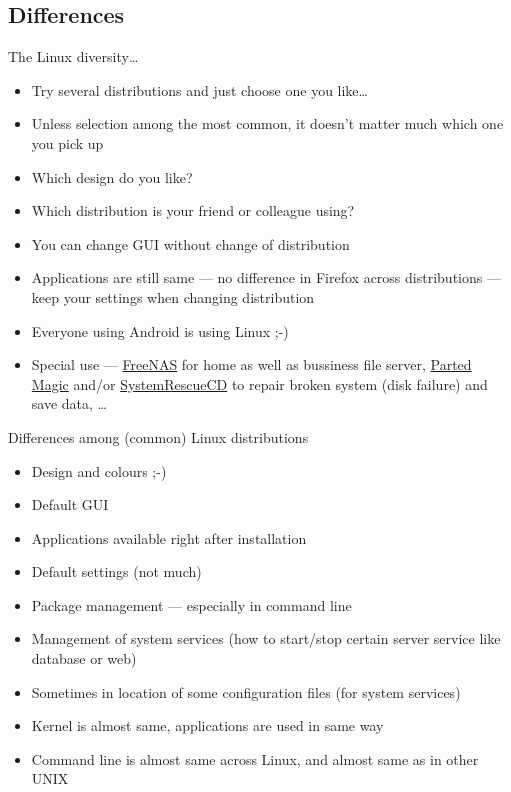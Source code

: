 \documentclass[compress, ucs, xelatex, 11pt, xcolor=svgnames,
  hyperref={
    bookmarks=true,
    unicode=true,
    colorlinks=true,
    pdftitle={Linux, command line and MetaCentrum},
    plainpages=false,
    pdfauthor={Vojtech Zeisek},
    pdfsubject={Course about use of Linux command line, writing shell scripts and using MetaCentrum of CESNET},
    pdfcreator={XeLaTeX, http://www.xelatex.org/},
    pdfkeywords={Linux, GNU, BASH, shell, command line, MetaCentrum},
    linkcolor=Sienna,
    anchorcolor=black,
    citecolor=green,
    filecolor=magenta,
    menucolor=Sienna,
    urlcolor=cyan,
    pdftex},
  url={hyphens, lowtilde} %
  ]{beamer}
\begin{document}
\subsection{Differences}

\begin{frame}{The Linux diversity\ldots}
\begin{itemize}
  \item Try several distributions and just choose one you like\ldots
  \item Unless selection among the most common, it doesn't matter much which one you pick up
  \item Which design do you like?
  \item Which distribution is your friend or colleague using?
  \item You can change GUI without change of distribution
  \item Applications are still same --- no difference in Firefox across distributions --- keep your settings when changing distribution
  \item Everyone using Android is using Linux ;-)
  \item Special use --- \href{http://www.freenas.org/}{FreeNAS} for home as well as bussiness file server, \href{https://partedmagic.com/}{Parted Magic} and/or \href{https://www.system-rescue-cd.org/SystemRescueCd_Homepage}{SystemRescueCD} to repair broken system (disk failure) and save data, \ldots
\end{itemize}
\end{frame}

\begin{frame}{Differences among (common) Linux distributions}
\begin{itemize}
  \item Design and colours ;-)
  \item Default GUI
  \item Applications available right after installation
  \item Default settings (not much)
  \item Package management --- especially in command line
  \item Management of system services (how to start/stop certain server service like database or web)
  \item Sometimes in location of some configuration files (for system services)
  \item Kernel is almost same, applications are used in same way
  \item Command line is almost same across Linux, and almost same as in other UNIX
\end{itemize}
\end{frame}
\end{document}
